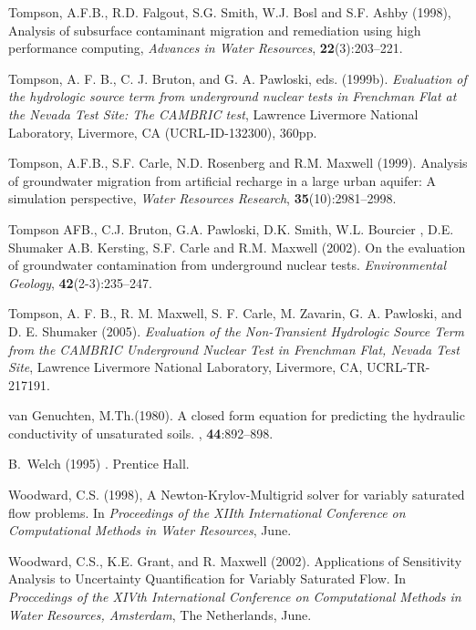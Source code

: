 \begin{thebibliography}{99}
  Tompson, A.F.B., R.D. Falgout, S.G. Smith, W.J. Bosl and
S.F. Ashby (1998), Analysis of subsurface contaminant migration and
remediation using high performance computing, {\em Advances in Water
Resources}, { \bf 22}(3):203--221.

Tompson, A. F. B., C. J. Bruton, and G. A. Pawloski, eds. (1999b). {\em Evaluation of the hydrologic source term from underground nuclear tests in Frenchman Flat at the Nevada Test Site: The CAMBRIC test}, Lawrence Livermore National Laboratory, Livermore, CA (UCRL-ID-132300), 360pp. 

  Tompson, A.F.B., S.F. Carle, N.D. Rosenberg and R.M. Maxwell
 (1999). Analysis of groundwater migration from artificial recharge in a large
 urban aquifer: A simulation perspective, {\em Water Resources
Research}, {\bf 35}(10):2981--2998.

Tompson AFB., C.J. Bruton, G.A. Pawloski, D.K. Smith, W.L. Bourcier , D.E. Shumaker A.B. Kersting, S.F. Carle and R.M. Maxwell (2002). On the evaluation of groundwater contamination from underground nuclear tests.  {\em Environmental Geology}, {\bf 42}(2-3):235--247.

Tompson, A. F. B., R. M. Maxwell, S. F. Carle, M. Zavarin, G. A. Pawloski, and D. E. Shumaker (2005). {\em Evaluation of the Non-Transient Hydrologic Source Term from the CAMBRIC Underground Nuclear Test in Frenchman Flat, Nevada Test Site}, Lawrence Livermore National Laboratory, Livermore, CA, UCRL-TR-217191.

{van Genuchten}, M.Th.(1980). 
\newblock A closed form equation for predicting the hydraulic conductivity of
  unsaturated soils.
, {\bf 44}:892--898.

B.~Welch (1995)
.
\newblock Prentice Hall.

Woodward, C.S. (1998),
\newblock A {N}ewton-{K}rylov-{M}ultigrid solver for variably saturated flow
  problems.
\newblock In {\em Proceedings of the XIIth International Conference on
  Computational Methods in Water Resources}, June.

Woodward, C.S., K.E. Grant, and R. Maxwell (2002). Applications of Sensitivity Analysis to Uncertainty Quantification for Variably Saturated Flow.
\newblock In {\em Proccedings of the XIVth International Conference on Computational Methods in Water Resources, Amsterdam}, The Netherlands, June.

\end{thebibliography}
